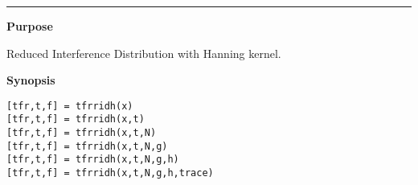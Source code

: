 

\hspace*{-1.6cm}{\Large \bf tfrridh}

\vspace*{-.4cm}
\hspace*{-1.6cm}\rule[0in]{16.5cm}{.02cm}
\vspace*{.2cm}

{\bf \large {}\selectfont Purpose}\\
\hspace*{1.5cm}
\begin{minipage}[t]{13.5cm}
Reduced Interference Distribution with Hanning kernel.
\end{minipage}
\vspace*{.5cm}

{\bf \large {}\selectfont Synopsis}\\
\hspace*{1.5cm}
\begin{minipage}[t]{13.5cm}
\begin{verbatim}
[tfr,t,f] = tfrridh(x)
[tfr,t,f] = tfrridh(x,t)
[tfr,t,f] = tfrridh(x,t,N)
[tfr,t,f] = tfrridh(x,t,N,g)
[tfr,t,f] = tfrridh(x,t,N,g,h)
[tfr,t,f] = tfrridh(x,t,N,g,h,trace)
\end{verbatim}
\end{minipage}
\vspace*{.5cm}


